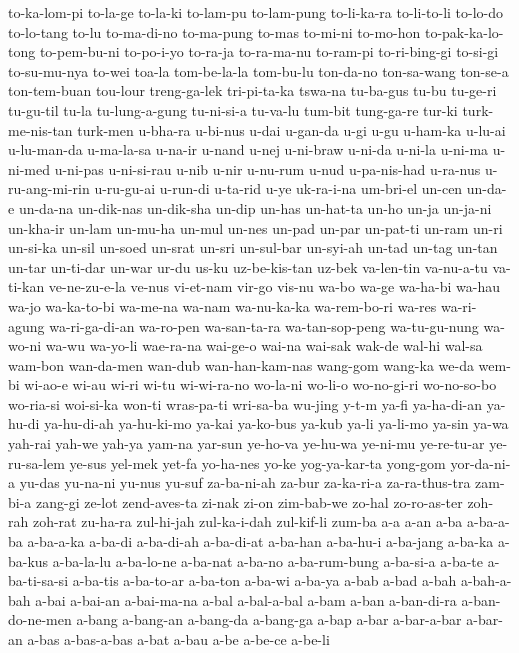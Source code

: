 {to-ka-lom-pi to-la-ge to-la-ki to-lam-pu to-lam-pung to-li-ka-ra
to-li-to-li to-lo-do to-lo-tang to-lu to-ma-di-no to-ma-pung to-mas
to-mi-ni to-mo-hon to-pak-ka-lo-tong to-pem-bu-ni to-po-i-yo to-ra-ja
to-ra-ma-nu to-ram-pi to-ri-bing-gi to-si-gi to-su-mu-nya to-wei toa-la
tom-be-la-la tom-bu-lu ton-da-no ton-sa-wang ton-se-a ton-tem-buan
tou-lour treng-ga-lek tri-pi-ta-ka tswa-na tu-ba-gus tu-bu tu-ge-ri
tu-gu-til tu-la tu-lung-a-gung tu-ni-si-a tu-va-lu tum-bit tung-ga-re
tur-ki turk-me-nis-tan turk-men u-bha-ra u-bi-nus u-dai u-gan-da u-gi u-gu
u-ham-ka u-lu-ai u-lu-man-da u-ma-la-sa u-na-ir u-nand u-nej u-ni-braw
u-ni-da u-ni-la u-ni-ma u-ni-med u-ni-pas u-ni-si-rau u-nib u-nir u-nu-rum
u-nud u-pa-nis-had u-ra-nus u-ru-ang-mi-rin u-ru-gu-ai u-run-di u-ta-rid
u-ye uk-ra-i-na um-bri-el un-cen un-da-e un-da-na un-dik-nas un-dik-sha
un-dip un-has un-hat-ta un-ho un-ja un-ja-ni un-kha-ir un-lam un-mu-ha
un-mul un-nes un-pad un-par un-pat-ti un-ram un-ri un-si-ka un-sil un-soed
un-srat un-sri un-sul-bar un-syi-ah un-tad un-tag un-tan un-tar un-ti-dar
un-war ur-du us-ku uz-be-kis-tan uz-bek va-len-tin va-nu-a-tu va-ti-kan
ve-ne-zu-e-la ve-nus vi-et-nam vir-go vis-nu wa-bo wa-ge wa-ha-bi wa-hau
wa-jo wa-ka-to-bi wa-me-na wa-nam wa-nu-ka-ka wa-rem-bo-ri wa-res
wa-ri-agung wa-ri-ga-di-an wa-ro-pen wa-san-ta-ra wa-tan-sop-peng
wa-tu-gu-nung wa-wo-ni wa-wu wa-yo-li wae-ra-na wai-ge-o wai-na wai-sak
wak-de wal-hi wal-sa wam-bon wan-da-men wan-dub wan-han-kam-nas wang-gom
wang-ka we-da wem-bi wi-ao-e wi-au wi-ri wi-tu wi-wi-ra-no wo-la-ni
wo-li-o wo-no-gi-ri wo-no-so-bo wo-ria-si woi-si-ka won-ti wras-pa-ti
wri-sa-ba wu-jing y-t-m ya-fi ya-ha-di-an ya-hu-di ya-hu-di-ah ya-hu-ki-mo
ya-kai ya-ko-bus ya-kub ya-li ya-li-mo ya-sin ya-wa yah-rai yah-we yah-ya
yam-na yar-sun ye-ho-va ye-hu-wa ye-ni-mu ye-re-tu-ar ye-ru-sa-lem ye-sus
yel-mek yet-fa yo-ha-nes yo-ke yog-ya-kar-ta yong-gom yor-da-ni-a yu-das
yu-na-ni yu-nus yu-suf za-ba-ni-ah za-bur za-ka-ri-a za-ra-thus-tra
zam-bi-a zang-gi ze-lot zend-aves-ta zi-nak zi-on zim-bab-we zo-hal
zo-ro-as-ter zoh-rah zoh-rat zu-ha-ra zul-hi-jah zul-ka-i-dah zul-kif-li
zum-ba a-a a-an a-ba a-ba-a-ba a-ba-a-ka a-ba-di a-ba-di-ah a-ba-di-at
a-ba-han a-ba-hu-i a-ba-jang a-ba-ka a-ba-kus a-ba-la-lu a-ba-lo-ne
a-ba-nat a-ba-no a-ba-rum-bung a-ba-si-a a-ba-te a-ba-ti-sa-si a-ba-tis
a-ba-to-ar a-ba-ton a-ba-wi a-ba-ya a-bab a-bad a-bah a-bah-a-bah a-bai
a-bai-an a-bai-ma-na a-bal a-bal-a-bal a-bam a-ban a-ban-di-ra
a-ban-do-ne-men a-bang a-bang-an a-bang-da a-bang-ga a-bap a-bar
a-bar-a-bar a-bar-an a-bas a-bas-a-bas a-bat a-bau a-be a-be-ce a-be-li
}
